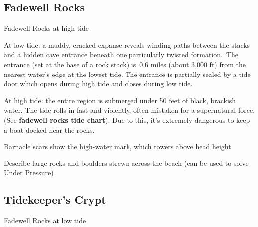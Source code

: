 \documentclass[10pt,twocolumn]{article}
\renewcommand{\textsc}[1]{\XCharterSC#1}
\let\oldtextbf\textbf
\renewcommand{\textbf}[1]{\oldtextbf{{#1}}}
\begin{document}
\subsection{Fadewell Rocks}\label{fadewell-rocks}

\begin{tcolorbox}[
  colback={imagecolor},
  coltext=black,
  colframe=black,
  boxrule=1pt,
  arc=6pt,
  left=4pt,
  right=4pt,
  top=2pt,
  bottom=2pt,
  boxsep=4pt,
  before skip=10pt,
  after skip=10pt,
  fontupper={\blockquoteFont\small\linespread{0.9}\selectfont\color{black}}
]

\faPhotoVideo\hspace{0.8em}\begin{minipage}[t]{\dimexpr\linewidth-1.8em\hangindent=1.8em\hangafter=0}Fadewell
Rocks at high tide

\end{minipage}\end{tcolorbox}

At low tide: a muddy, cracked expanse reveals winding paths between the
stacks and a hidden cave entrance beneath one particularly twisted
formation.~The entrance (set at the base of a rock stack) is~0.6 miles
(about 3,000 ft) from the nearest water's edge at the lowest tide. The
entrance is partially sealed by a tide door which opens during high tide
and closes during low tide.

At high tide: the entire region is submerged under 50 feet of black,
brackish water. The tide rolls in fast and violently, often mistaken for
a supernatural force. (See
\textcolor{keywordcolor}{\textbf{\textsc{fadewell rocks tide chart}}}).
Due to this, it's extremely dangerous to keep a boat docked near the
rocks.

Barnacle scars show the high-water mark, which towers above head height

Describe large rocks and boulders strewn across the beach (can be used
to solve Under Pressure)

\subsection{Tidekeeper's Crypt}\label{tidekeepers-crypt}

\begin{tcolorbox}[
  colback={imagecolor},
  coltext=black,
  colframe=black,
  boxrule=1pt,
  arc=6pt,
  left=4pt,
  right=4pt,
  top=2pt,
  bottom=2pt,
  boxsep=4pt,
  before skip=10pt,
  after skip=10pt,
  fontupper={\blockquoteFont\small\linespread{0.9}\selectfont\color{black}}
]

\faPhotoVideo\hspace{0.8em}\begin{minipage}[t]{\dimexpr\linewidth-1.8em\hangindent=1.8em\hangafter=0}Fadewell
Rocks at low tide

\end{minipage}\end{tcolorbox}
\end{document}
